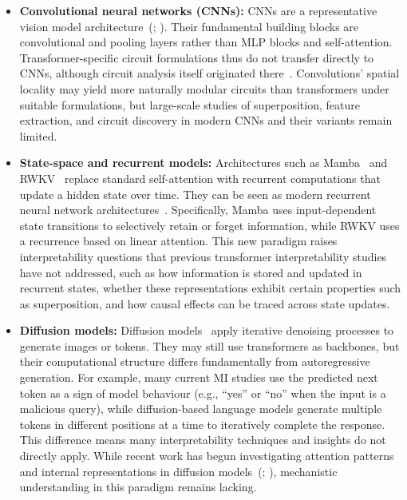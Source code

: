 \begin{itemize}
    \item \textbf{Convolutional neural networks (CNNs):} CNNs are a representative vision model architecture~(; ). Their fundamental building blocks are convolutional and pooling layers rather than MLP blocks and self-attention. Transformer-specific circuit formulations thus do not transfer directly to CNNs, although circuit analysis itself originated there~. Convolutions' spatial locality may yield more naturally modular circuits than transformers under suitable formulations, but large-scale studies of superposition, feature extraction, and circuit discovery in modern CNNs and their variants remain limited.

    \item \textbf{State-space and recurrent models:} Architectures such as Mamba~ and RWKV~ replace standard self-attention with recurrent computations that update a hidden state over time. They can be seen as modern recurrent neural network architectures~. Specifically, Mamba uses input-dependent state transitions to selectively retain or forget information, while RWKV uses a recurrence based on linear attention. This new paradigm raises interpretability questions that previous transformer interpretability studies have not addressed, such as how information is stored and updated in recurrent states, whether these representations exhibit certain properties such as superposition, and how causal effects can be traced across state updates.

    \item \textbf{Diffusion models:} Diffusion models~ apply iterative denoising processes to generate images or tokens. They may still use transformers as backbones, but their computational structure differs fundamentally from autoregressive generation. For example, many current MI studies use the predicted next token as a sign of model behaviour (e.g., ``yes'' or ``no'' when the input is a malicious query), while diffusion-based language models generate multiple tokens in different positions at a time to iteratively complete the response. This difference means many interpretability techniques and insights do not directly apply. While recent work has begun investigating attention patterns and internal representations in diffusion models~(; ), mechanistic understanding in this paradigm remains lacking.
\end{itemize}

